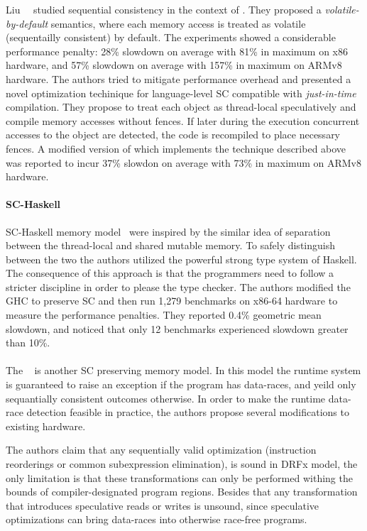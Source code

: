 Liu~\etal~\cite{Liu-al:OOPSLA17, Liu-al:PLDI19} studied 
sequential consistency in the context of \Java.  
They proposed a \emph{volatile-by-default} semantics,
where each memory access is treated as volatile 
(\ie sequentailly consistent) by default. 
The experiments showed a considerable performance penalty:
28\% slowdown on average with 81\% in maximum on x86 hardware,
and 57\% slowdown on average with 157\% in maximum on ARMv8 hardware.
The authors tried to mitigate performance overhead and presented  
a novel optimization techinique for language-level SC
compatible with \emph{just-in-time} compilation. 
They propose to treat each object as thread-local speculatively 
and compile memory accesses without fences. 
If later during the execution concurrent accesses to the object  
are detected, the code is recompiled to place necessary fences.
A modified version of \JVM which implements the technique
described above was reported to incur 37\% slowdon on average 
with 73\% in maximum on ARMv8 hardware.

\paragraph{SC-Haskell}

SC-Haskell memory model~\cite{Vollmer-al:PPoPP17}
were inspired by the similar idea of separation
between the thread-local and shared mutable memory. 
To safely distinguish between the two 
the authors utilized the powerful strong type system of Haskell. 
The consequence of this approach is that the 
programmers need to follow a stricter discipline 
in order to please the type checker. 
The authors modified the GHC to preserve SC 
and then run 1,279 benchmarks on x86-64 hardware
to measure the performance penalties.
They reported 0.4\% geometric mean slowdown,
and noticed that only 12 benchmarks experienced 
slowdown greater than 10\%.

\paragraph{\DRFx}

The \DRFx~\cite{Marino-al:PLDI10} is another 
SC preserving memory model. In this model
the runtime system is guaranteed to raise 
an exception if the program has data-races, 
and yeild only sequantially consistent outcomes otherwise.
In order to make the runtime data-race detection feasible 
in practice, the authors propose several modifications 
to existing hardware.

The authors claim that any sequentially valid optimization 
(\eg instruction reorderings or common subexpression elimination),
is sound in DRFx model, the only limitation is that
these transformations can only be performed
withing the bounds of compiler-designated program regions.
Besides that any transformation that introduces 
speculative reads or writes is unsound,
since speculative optimizations can bring
data-races into otherwise race-free programs.

